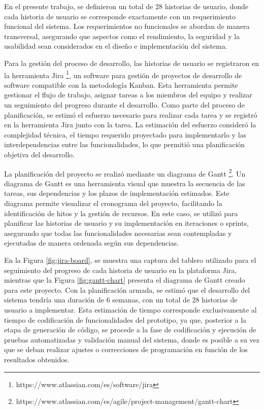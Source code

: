 En el presente trabajo, se definieron un total de 28 historias de usuario, donde cada historia de usuario se corresponde exactamente con un requerimiento funcional del sistema. Los requerimientos no funcionales se abordan de manera transversal, asegurando que aspectos como el rendimiento, la seguridad y la usabilidad sean considerados en el diseño e implementación del sistema.

Para la gestión del proceso de desarrollo, las historias de usuario se registraron en la herramienta Jira \footnote{https://www.atlassian.com/es/software/jira}, un software para gestión de proyectos de desarrollo de software compatible con la metodología Kanban. Esta herramienta permite gestionar el flujo de trabajo, asignar tareas a los miembros del equipo y realizar un seguimiento del progreso durante el desarrollo. Como parte del proceso de planificación, se estimó el esfuerzo necesario para realizar cada tarea y se registró en la herramienta Jira junto con la tarea. La estimación del esfuerzo consideró la complejidad técnica, el tiempo requerido proyectado para implementarlo y las interdependencias entre las funcionalidades, lo que permitió una planificación objetiva del desarrollo.

La planificación del proyecto se realizó mediante un diagrama de Gantt \footnote{https://www.atlassian.com/es/agile/project-management/gantt-chart}. Un diagrama de Gantt es una herramienta visual que muestra la secuencia de las tareas, sus dependencias y los plazos de implementación estimados. Este diagrama permite visualizar el cronograma del proyecto, facilitando la identificación de hitos y la gestión de recursos. En este caso, se utilizó para planificar las historias de usuario y su implementación en iteraciones o sprints, asegurando que todas las funcionalidades necesarias sean contempladas y ejecutadas de manera ordenada según sus dependencias.

En la Figura \ref{fig:jira-board}, se muestra una captura del tablero utilizado para el seguimiento del progreso de cada historia de usuario en la plataforma Jira, mientras que la Figura \ref{fig:gantt-chart} presenta el diagrama de Gantt creado para este proyecto. Con la planificación armada, se estimó que el desarrollo del sistema tendría una duración de 6 semanas, con un total de 28 historias de usuario a implementar. Esta estimación de tiempo corresponde exclusivamente al tiempo de codificación de funcionalidades del prototipo, ya que, posterior a la etapa de generación de código, se procede a la fase de codificación y ejecución de pruebas automatizadas y validación manual del sistema, donde es posible a su vez que se deban realizar ajustes o correcciones de programación en función de los resultados obtenidos.

